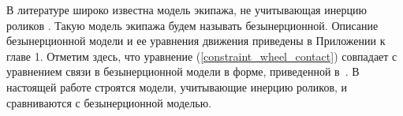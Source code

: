 \vspace{15pt}

В литературе широко известна модель экипажа, не учитывающая инерцию роликов \cite{ZobovaTatarinovAspecty2006,zobova2008svobodnye8020851,ZobovaTatarinovPMM,Zobova2011,MartynenkoFormalskii2007,formalskii,Martynenko2010_rus,Borisov2011,KilinBobykin2014}. Такую модель экипажа будем называть безынерционной. Описание безынерционной модели и ее уравнения движения приведены в Приложении к главе 1. Отметим здесь, что уравнение (\ref{constraint_wheel_contact}) совпадает с уравнением связи в безынерционной модели в форме, приведенной в~\cite{Zobova2011}. В настоящей работе строятся модели, учитывающие инерцию роликов, и сравниваются с безынерционной моделью.

